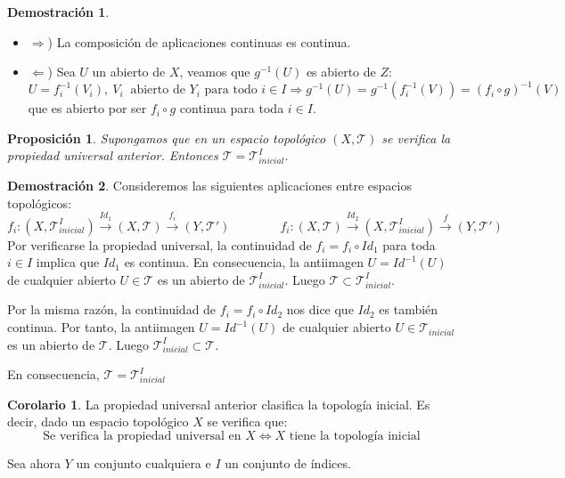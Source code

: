 \documentclass[12pt,twoside]{report}
\newcommand\mc[1]{\mathcal{#1}}
\theoremstyle{azul}
\theoremstyle{azul2}
\theoremstyle{plain}
\newtheorem*{prop}{Proposición}
\theoremstyle{definition}
\newtheorem*{dem}{Demostración}
\newtheorem*{cor}{Corolario}
\theoremstyle{remark}
\begin{document}
\: \vspace{-15mm} \begin{dem} \: \vspace{-5mm}
\begin{itemize} 
    \item $\Rightarrow$) \: La composición de aplicaciones continuas es continua.
    \item $\Leftarrow$) \: Sea $U$ un abierto de $X$, veamos que $g^{-1}(U)$ es abierto de $Z$:
$$U=f_i^{-1}(V_i), \: V_i \:\text{ abierto de } Y_i \text{ para todo }i\in I \Rightarrow g^{-1}(U)=g^{-1}(f_i^{-1}(V))=(f_i \circ g)^{-1}(V)$$
\hspace{8mm} que es abierto por ser $f_i \circ g$ continua para toda $i\in I$.
\end{itemize}
\end{dem}
\begin{prop}
Supongamos que en un espacio topológico $(X,\mc{T})$ se verifica la propiedad universal anterior. Entonces $\mc{T}=\mc{T}_{inicial}^I$.
\end{prop}
\begin{dem}
Consideremos las siguientes aplicaciones entre espacios topológicos:
$$f_i: (X,\mc{T}_{inicial}^I)\stackrel{Id_1}{\longrightarrow}(X,\mc{T})\stackrel{f_i}{\longrightarrow}(Y,\mc{T}') \qquad\qquad f_i: (X,\mc{T})\stackrel{Id_2}{\longrightarrow}(X,\mc{T}_{inicial}^I)\stackrel{f}{\longrightarrow}(Y,\mc{T}')$$
Por verificarse la propiedad universal, la continuidad de $f_i=f_i\circ Id_1$ para toda $i\in I$ implica que $Id_1$ es continua. En consecuencia, la antiimagen $U=Id^{-1}(U)$ de cualquier abierto $U\in \mc{T}$ es un abierto de $\mc{T}_{inicial}^I$. Luego $\mc{T}\subset\mc{T}_{inicial}^I$.

Por la misma razón, la continuidad de $f_i=f_i\circ Id_2$ nos dice que $Id_2$ es también continua. Por tanto, la antiimagen $U=Id^{-1}(U)$ de cualquier abierto $U\in \mc{T}_{inicial}$ es un abierto de $\mc{T}$. Luego $\mc{T}_{inicial}^I\subset\mc{T}$. 

En consecuencia, $\mc{T}=\mc{T}_{inicial}^I$
\end{dem}
\begin{cor}
La propiedad universal anterior clasifica la topología inicial. Es decir, dado un espacio topológico $X$ se verifica que:
$$\text{Se verifica la propiedad universal en }X\Longleftrightarrow X \text{ tiene la topología inicial}$$ 
\end{cor}
Sea ahora $Y$ un conjunto cualquiera e $I$ un conjunto de índices.
\end{document}
